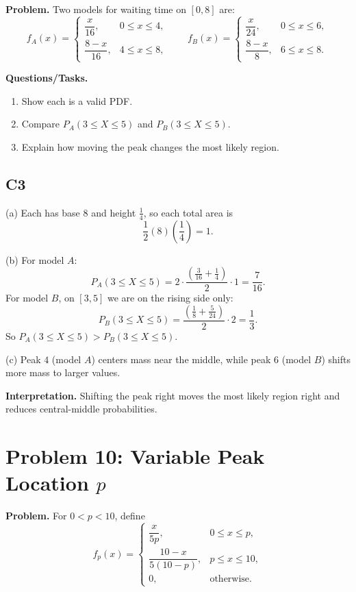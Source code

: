 \textbf{Problem.}
Two models for waiting time on $[0,8]$ are:
\[
f_A(x)=\begin{cases}
\dfrac{x}{16}, & 0\le x\le 4,\\
\dfrac{8-x}{16}, & 4\le x\le 8,
\end{cases}
\qquad
f_B(x)=\begin{cases}
\dfrac{x}{24}, & 0\le x\le 6,\\
\dfrac{8-x}{8}, & 6\le x\le 8.
\end{cases}
\]

\textbf{Questions/Tasks.}
\begin{enumerate}
\item Show each is a valid PDF.
\item Compare $P_A(3\le X\le 5)$ and $P_B(3\le X\le 5)$.
\item Explain how moving the peak changes the most likely region.
\end{enumerate}

\subsection*{C3}
(a) Each has base $8$ and height $\frac14$, so each total area is
\[
\frac12(8)\left(\frac14\right)=1.
\]

(b) For model $A$:
\[
P_A(3\le X\le 5)=2\cdot\frac{\left(\frac{3}{16}+\frac14\right)}{2}\cdot1=\frac{7}{16}.
\]
For model $B$, on $[3,5]$ we are on the rising side only:
\[
P_B(3\le X\le 5)=\frac{\left(\frac18+\frac{5}{24}\right)}{2}\cdot2=\frac13.
\]
So $P_A(3\le X\le 5)>P_B(3\le X\le 5)$.

(c) Peak $4$ (model $A$) centers mass near the middle, while peak $6$ (model $B$) shifts more mass to larger values.

\textbf{Interpretation.}
Shifting the peak right moves the most likely region right and reduces central-middle probabilities.

\section{Problem 10: Variable Peak Location $p$}

\textbf{Problem.}
For $0<p<10$, define
\[
f_p(x)=\begin{cases}
\dfrac{x}{5p}, & 0\le x\le p,\\
\dfrac{10-x}{5(10-p)}, & p\le x\le 10,\\
0, & \text{otherwise.}
\end{cases}
\]

